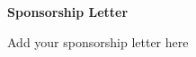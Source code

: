 \begin{center}
{\huge \bf Sponsorship Letter}
\end{center}
\begin{center}
Add your sponsorship letter here
\end{center}